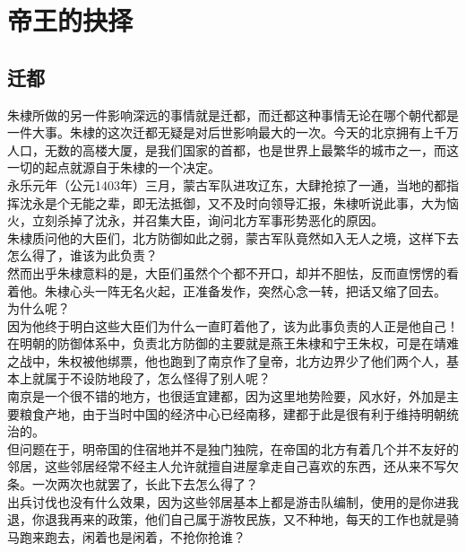 \section{帝王的抉择}
\ifnum{}
	\begin{multicols}{\theparacolNo}
\fi
\subsection{迁都}
朱棣所做的另一件影响深远的事情就是迁都，而迁都这种事情无论在哪个朝代都是一件大事。朱棣的这次迁都无疑是对后世影响最大的一次。今天的北京拥有上千万人口，无数的高楼大厦，是我们国家的首都，也是世界上最繁华的城市之一，而这一切的起点就源自于朱棣的一个决定。\\

永乐元年（公元1403年）三月，蒙古军队进攻辽东，大肆抢掠了一通，当地的都指挥沈永是个无能之辈，即无法抵御，又不及时向领导汇报，朱棣听说此事，大为恼火，立刻杀掉了沈永，并召集大臣，询问北方军事形势恶化的原因。\\

朱棣质问他的大臣们，北方防御如此之弱，蒙古军队竟然如入无人之境，这样下去怎么得了，谁该为此负责？\\

然而出乎朱棣意料的是，大臣们虽然个个都不开口，却并不胆怯，反而直愣愣的看着他。朱棣心头一阵无名火起，正准备发作，突然心念一转，把话又缩了回去。\\

为什么呢？\\

因为他终于明白这些大臣们为什么一直盯着他了，该为此事负责的人正是他自己！\\

在明朝的防御体系中，负责北方防御的主要就是燕王朱棣和宁王朱权，可是在靖难之战中，朱权被他绑票，他也跑到了南京作了皇帝，北方边界少了他们两个人，基本上就属于不设防地段了，怎么怪得了别人呢？\\

南京是一个很不错的地方，也很适宜建都，因为这里地势险要，风水好，外加是主要粮食产地，由于当时中国的经济中心已经南移，建都于此是很有利于维持明朝统治的。\\

但问题在于，明帝国的住宿地并不是独门独院，在帝国的北方有着几个并不友好的邻居，这些邻居经常不经主人允许就擅自进屋拿走自己喜欢的东西，还从来不写欠条。一次两次也就罢了，长此下去怎么得了？\\

出兵讨伐也没有什么效果，因为这些邻居基本上都是游击队编制，使用的是你进我退，你退我再来的政策，他们自己属于游牧民族，又不种地，每天的工作也就是骑马跑来跑去，闲着也是闲着，不抢你抢谁？\\


\end{multicols}
